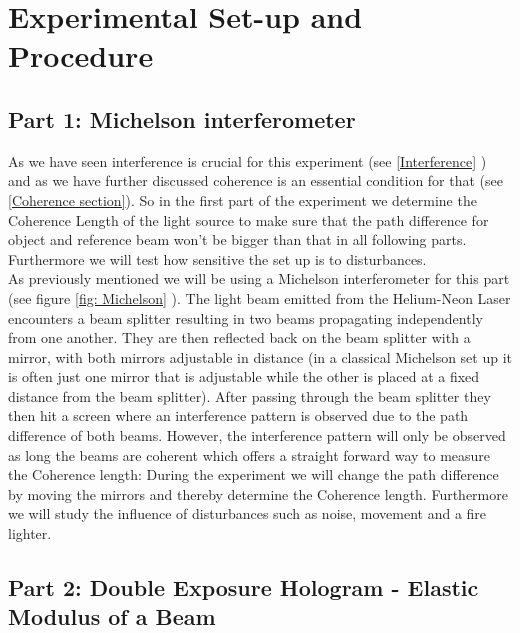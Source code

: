 \section{Experimental Set-up and Procedure}

\subsection{Part 1: Michelson interferometer}

As we have seen interference is crucial for this experiment (see \ref{Interference} ) and as we have further discussed coherence is an essential condition for that (see \ref{Coherence section}). So in the first part of the experiment we determine the Coherence Length of the light source to make sure that the path difference for object and reference beam won't be bigger than that in all following parts. Furthermore we will test how sensitive the set up is to disturbances.\\
As previously mentioned we will be using a Michelson interferometer for this part (see figure \ref{fig: Michelson} ). The light beam emitted from the Helium-Neon Laser encounters a beam splitter resulting in two beams propagating independently from one another. They are then reflected back on the beam splitter with a mirror, with both mirrors adjustable in distance (in a classical Michelson set up it is often just one mirror that is adjustable while the other is placed at a fixed distance from the beam splitter). After passing through the beam splitter they then hit a screen where an interference pattern is observed due to the path difference of both beams. However, the interference pattern will only be observed as long the beams are coherent which offers a straight forward way to measure the Coherence length: During the experiment we will change the path difference by moving the mirrors and thereby determine the Coherence length. Furthermore we will study the influence of disturbances such as noise, movement and a fire lighter.




\subsection{Part 2: Double Exposure Hologram - Elastic Modulus of a Beam \label{DEH}}

